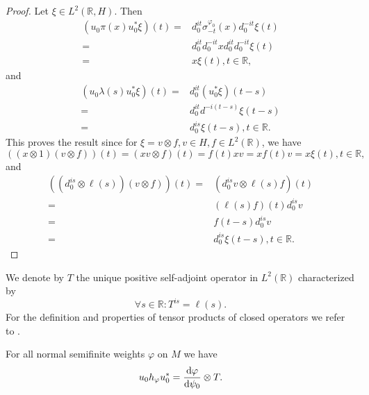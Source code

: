 \begin{proof}
    Let $\xi\in L^2(\mathbb{R},H)$. Then
    \[
        \begin{split}
            (u_0\pi(x)u_0^*\xi)(t)=&d_0^{it}\sigma_{-t}^{\varphi_0}(x)d_0^{-it}\xi(t)\\
            =&d_0^{it}d_0^{-it}xd_0^{it}d_0^{-it}\xi(t)\\
            =&x\xi(t),t\in \mathbb{R},
        \end{split}
    \]
    and
    \[
        \begin{split}
            (u_0\lambda(s)u_0^*\xi)(t)=&d_0^{it}(u_0^*\xi)(t-s)\\
            =&d_0^{it}d^{-i(t-s)}\xi(t-s)\\
            =&d_0^{is}\xi(t-s),t\in \mathbb{R}.
        \end{split}
    \]
    This proves the result since for $\xi=v\otimes f,v\in H,f\in L^2(\mathbb{R})$, we have
    \[
        ((x\otimes 1)(v\otimes f))(t)=(xv\otimes f)(t)=f(t)xv=xf(t)v=x\xi(t),t\in \mathbb{R},
    \]
    and
    \[
        \begin{split}
            ((d_0^{is}\otimes\ell(s))(v\otimes f))(t)=&(d_0^{is}v\otimes \ell(s)f)(t)\\
            =&(\ell(s)f)(t)d_0^{is}v\\
            =&f(t-s)d_0^{is}v\\
            =&d_0^{is}\xi(t-s),t\in \mathbb{R}.
        \end{split}
    \]
\end{proof}
We denote by $T$ the unique positive self-adjoint operator in $L^2(\mathbb{R})$ characterized by
\begin{equation}
    \forall s\in \mathbb{R}: T^{is}=\ell(s).
\end{equation}
For the definition and properties of tensor products of closed operators we refer to \cite[Section 9.33]{17}.
\begin{proposition}\label{Chap4: Prop: 4}
    For all normal semifinite weights $\varphi$ on $M$ we have
    \begin{equation}\label{Chap4: Eqn: 9}
        u_0h_\varphi u_0^*=\dv{\varphi}{\psi_0}\otimes T.
    \end{equation}
\end{proposition}
